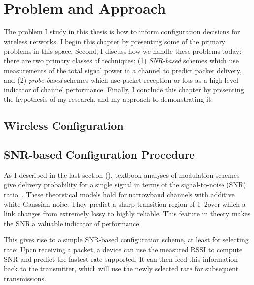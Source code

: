 \ifx\mainfile\undefined

\setcounter{chapter}{2} %
\fi

\cleardoublepage
\chapter{Problem and Approach}
\label{chap:problem}
\label{chap:approach}

The problem I study in this thesis is how to inform configuration decisions for wireless networks. I begin this chapter by presenting some of the primary problems in this space. Second, I discuss how we handle these problems today: there are two primary classes of techniques: (1) \emph{SNR-based} schemes which use measurements of the total signal power in a channel to predict packet delivery, and (2) \emph{probe-based} schemes which use packet reception or loss as a high-level indicator of channel performance. Finally, I conclude this chapter by presenting the hypothesis of my research, and my approach to demonstrating it.


\section{Wireless Configuration}

\section{SNR-based Configuration Procedure}
As I described in the last section (), textbook analyses of modulation schemes give delivery probability for a single signal in terms of the signal-to-noise (SNR) ratio~\cite{Goldsmith}.
These theoretical models hold for narrowband channels with additive white Gaussian noise. They predict a sharp transition region of 1--2\dB over which a link changes from extremely lossy to highly reliable. This feature in theory makes the SNR a valuable indicator of performance.

This gives rise to a simple SNR-based configuration scheme, at least for selecting rate: Upon receiving a packet, a device can use the measured RSSI to compute SNR and predict the fastest rate supported. It can then feed this information back to the transmitter, which will use the newly selected rate for subsequent transmissions.

